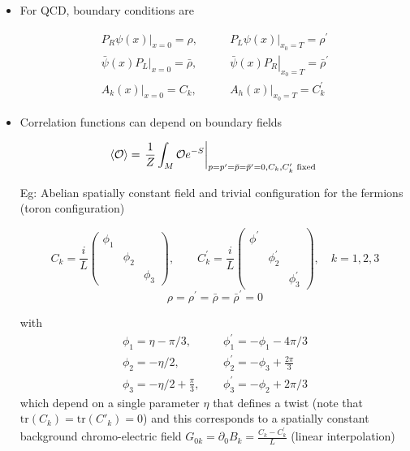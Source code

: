 \begin{itemize}
  \item For QCD, boundary conditions are

\begin{equation}
\begin{array}{ll}
P_R\left.\psi(x)\right|_{x=0}=\rho,\qquad & 
P_L\left.\psi(x)\right|_{x_{0}=T}=\rho^{\prime} \\
\bar{\psi}(x) P_L\left.\right|_{x=0}=\bar{\rho}, & 
\left.\bar{\psi}(x) P_{R}\right|_{x_{0}=T}=\bar{\rho}^{\prime} \\
\left.A_{k}(x)\right|_{x=0}=C_{k}, & \left.A_{h}(x)\right|_{x_{0}=T}=C_{k}^{\prime}
\end{array}
\end{equation}

  \item Correlation functions can depend on boundary fields

\begin{equation}
    \langle {\cal O}\rangle=\left.\frac{1}{Z} \int_{M} {\cal O} e^{-S}\right|_{p=p^{\prime}=\bar{p}=\bar{p}^{\prime}=0, C_{k}, C_{k}^{\prime} \text { fixed }}
\end{equation}


Eg: Abelian spatially constant field and trivial configuration for the fermions
(toron configuration)

\begin{equation}
    C_{k}=\frac{i}{L}\left(\begin{array}{ccc} \phi_{1}&&\\ & \phi_{2} &\\&& \phi_{3}\end{array}\right), \qquad 
C_{k}^{\prime}=\frac{i}{L}\left(\begin{array}{ccc} \phi^{\prime} &&\\&\phi_{2}^{\prime} &\\&&\phi_{3}^{\prime}\end{array}\right), \quad k=1,2,3
\end{equation}
\begin{equation}
\rho=\rho^{\prime}=\bar{\rho}=\bar{\rho}^{\prime}=0
\end{equation}

with
\begin{equation}
\begin{array}{ll}
\phi_{1}=\eta-\pi / 3,\qquad & \phi_{1}^{\prime}=-\phi_{1}-4 \pi / 3 \\
\phi_{2}=-\eta / 2, & \phi_{2}^{\prime}=-\phi_{3}+\frac{2 \pi}{3} \\
\phi_{3}=-\eta / 2+\frac{\pi}{3}, & \phi_{3}^{\prime}=-\phi_{2}+2 \pi / 3
\end{array}
\end{equation}
which depend on a single parameter $\eta$ that defines a twist (note that $\text{tr}(C_k)=\text{tr}(C'_k)=0$) and this corresponds to a spatially constant background chromo-electric field \(G_{0 k}=\partial_{0} B_{k}=\frac{C_{k}-C_{k}^{\prime}}{L}\) (linear interpolation)

\end{itemize}

